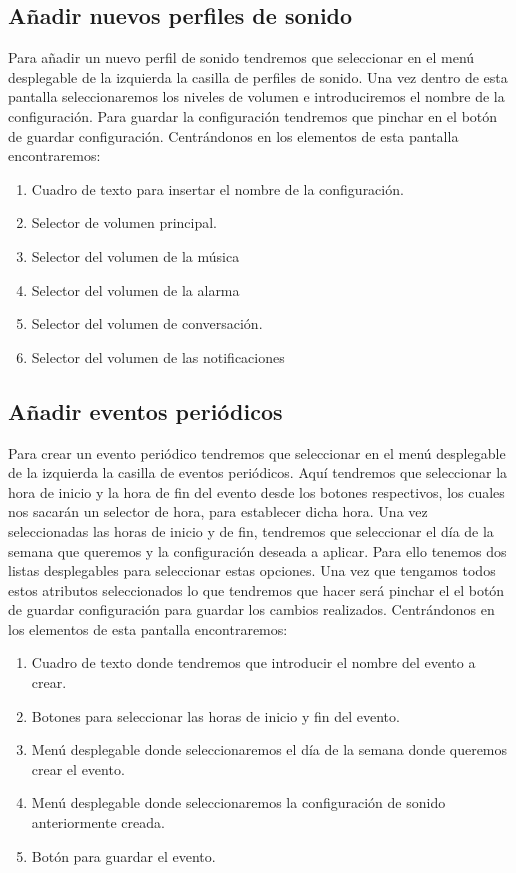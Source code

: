 \subsection{Añadir nuevos perfiles de sonido}
Para añadir un nuevo perfil de sonido tendremos que seleccionar en el menú desplegable de la izquierda la casilla de perfiles de sonido.
Una vez dentro de esta pantalla seleccionaremos los niveles de volumen e introduciremos el nombre de la configuración.
Para guardar la configuración tendremos que pinchar en el botón de guardar configuración.
Centrándonos en los elementos de esta pantalla encontraremos:
\begin{enumerate}
\item Cuadro de texto para insertar el nombre de la configuración.
\item Selector de volumen principal.
\item Selector del volumen de la música
\item Selector del volumen de la alarma
\item Selector del volumen de conversación.
\item Selector del volumen de las notificaciones
\end{enumerate}

\subsection{Añadir eventos periódicos}
Para crear un evento periódico tendremos que seleccionar en el menú desplegable de la izquierda la casilla de eventos periódicos.
Aquí tendremos que seleccionar la hora de inicio y la hora de fin del evento desde los botones respectivos, los cuales nos sacarán un selector de hora, para establecer dicha hora.
Una vez seleccionadas las horas de inicio y de fin, tendremos que seleccionar el día de la semana que queremos y la configuración deseada a aplicar. Para ello tenemos dos listas desplegables para seleccionar estas opciones.
Una vez que tengamos todos estos atributos seleccionados lo que tendremos que hacer será pinchar el el botón de guardar configuración para guardar los cambios realizados.
Centrándonos en los elementos de esta pantalla encontraremos:
\begin{enumerate}
\item Cuadro de texto donde tendremos que introducir el nombre del evento a crear.
\item Botones para seleccionar las horas de inicio y fin del evento.
\item Menú desplegable donde seleccionaremos el día de la semana donde queremos crear el evento.
\item Menú desplegable donde seleccionaremos la configuración de sonido anteriormente creada.
\item Botón para guardar el evento.
\end{enumerate}

